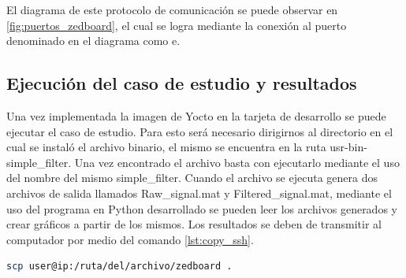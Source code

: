 El diagrama de este protocolo de comunicación se puede observar en \ref{fig:puertos_zedboard}, el cual se logra mediante la conexión al puerto denominado en el diagrama como e.


\subsection{Ejecución del caso de estudio y resultados}

Una vez implementada la imagen de Yocto en la tarjeta de desarrollo se puede ejecutar el caso de estudio. Para esto será necesario dirigirnos al directorio en el cual se instaló el archivo binario, el mismo se encuentra en la ruta usr-bin-simple\_filter. Una vez encontrado el archivo basta con ejecutarlo mediante el uso del nombre del mismo simple\_filter. Cuando el archivo se ejecuta genera dos archivos de salida llamados Raw\_signal.mat y Filtered\_signal.mat, mediante el uso del programa en Python desarrollado se pueden leer los archivos generados y crear gráficos a partir de los mismos. Los resultados se deben de transmitir al computador por medio del comando \ref{lst:copy_ssh}.

\begin{lstlisting}[language=bash, caption={Copiar archivo por protocolo SSH, Linux}, label=lst:copy_ssh]
    scp user@ip:/ruta/del/archivo/zedboard .
\end{lstlisting}

